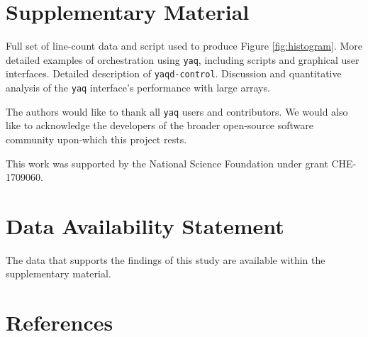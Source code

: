 \documentclass[aip, amsmath, amssymb, reprint,]{revtex4-2}
\newcommand\yaq{\texttt{yaq}}
\begin{document}
\section*{Supplementary Material}

Full set of line-count data and script used to produce Figure \ref{fig:histogram}.
More detailed examples of orchestration using \yaq{}, including scripts and graphical user interfaces.
Detailed description of \texttt{yaqd-control}.
Discussion and quantitative analysis of the \yaq{} interface's performance with large arrays.

\begin{acknowledgments}

The authors would like to thank all \yaq{} users and contributors.
We would also like to acknowledge the developers of the broader open-source software community upon-which this project rests.

This work was supported by the National Science Foundation under grant CHE-1709060.

\end{acknowledgments}

\section*{Data Availability Statement}

The data that supports the findings of this study are available within the supplementary material.

\section*{References}

\end{document}
